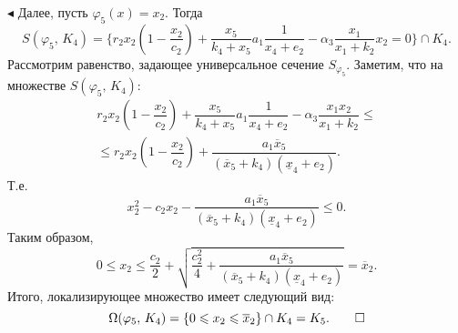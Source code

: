 \documentclass[12pt,a4paper]{extarticle}
\renewenvironment{proof}{\noindent$\blacktriangleleft$}{}
\theoremstyle{definition}
\theoremstyle{definition}
\theoremstyle{definition}
\begin{document}
\begin{proof}
		Далее, пусть $\varphi_5(x)=x_2$. Тогда 
		\[S(\varphi_5,\, K_4)=\{r_2x_2\left(1-\dfrac{x_2}{c_2}\right)+\dfrac{x_5}{k_4+x_5}a_1\dfrac{1}{x_4+e_2}-\alpha_3\dfrac{x_1}{x_1+k_2}x_2=0\}\cap K_4.\]
		Рассмотрим равенство, задающее универсальное сечение $S_{\varphi_5}$. Заметим, что на множестве $S(\varphi_5,\, K_4)$:
		\begin{multline*}
		r_2x_2\left(1-\dfrac{x_2}{c_2}\right)+\dfrac{x_5}{k_4+x_5}a_1\dfrac{1}{x_4+e_2}-\alpha_3\dfrac{x_1x_2}{x_1+k_2}\le\\
		\le r_2x_2\left(1-\dfrac{x_2}{c_2}\right)+\dfrac{a_1\overline{x}_5}{(\overline{x}_5+k_4)(\underline{x}_4+e_2)}.
		\end{multline*}
		Т.е.
		\[x_2^2-c_2x_2-\dfrac{a_1\overline{x}_5}{(\overline{x}_5+k_4)(\underline{x}_4+e_2)}\le 0.\]
		Таким образом, 
		\[0 \le x_2 \le \dfrac{c_2}{2}+\sqrt{\dfrac{c_2^2}{4}+\dfrac{a_1\overline{x}_5}{(\overline{x}_5+k_4)(\underline{x}_4+e_2)}}=\overline{x}_2.\]
		Итого, локализирующее множество имеет следующий вид:
		\[\Omega(\varphi_5,\, K_4)=\{0\le x_2 \le \overline{x}_2\} \cap K_4 = K_5.\qed\]
	\end{proof}
	
\end{document}
